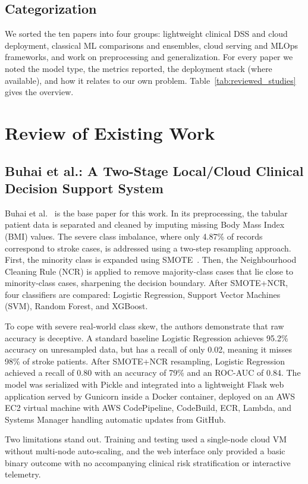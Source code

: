 \documentclass[10pt,journal,compsoc]{IEEEtran}
\begin{document}
\subsection{Categorization}
We sorted the ten papers into four groups: lightweight clinical DSS and cloud deployment, classical ML comparisons and ensembles, cloud serving and MLOps frameworks, and work on preprocessing and generalization. For every paper we noted the model type, the metrics reported, the deployment stack (where available), and how it relates to our own problem. Table~\ref{tab:reviewed_studies} gives the overview.

\section{Review of Existing Work}

\subsection{Buhai et al.: A Two-Stage Local/Cloud Clinical Decision Support System}
Buhai et al.~\cite{buhai2026} is the base paper for this work. In its preprocessing, the tabular patient data is separated and cleaned by imputing missing Body Mass Index (BMI) values. The severe class imbalance, where only 4.87\% of records correspond to stroke cases, is addressed using a two-step resampling approach. First, the minority class is expanded using SMOTE~\cite{chawla2002}. Then, the Neighbourhood Cleaning Rule (NCR) is applied to remove majority-class cases that lie close to minority-class cases, sharpening the decision boundary. After SMOTE+NCR, four classifiers are compared: Logistic Regression, Support Vector Machines (SVM), Random Forest, and XGBoost.

To cope with severe real-world class skew, the authors demonstrate that raw accuracy is deceptive. A standard baseline Logistic Regression achieves 95.2\% accuracy on unresampled data, but has a recall of only 0.02, meaning it misses 98\% of stroke patients. After SMOTE+NCR resampling, Logistic Regression achieved a recall of 0.80 with an accuracy of 79\% and an ROC-AUC of 0.84. The model was serialized with Pickle and integrated into a lightweight Flask web application served by Gunicorn inside a Docker container, deployed on an AWS EC2 virtual machine with AWS CodePipeline, CodeBuild, ECR, Lambda, and Systems Manager handling automatic updates from GitHub.

Two limitations stand out. Training and testing used a single-node cloud VM without multi-node auto-scaling, and the web interface only provided a basic binary outcome with no accompanying clinical risk stratification or interactive telemetry.
\end{document}
